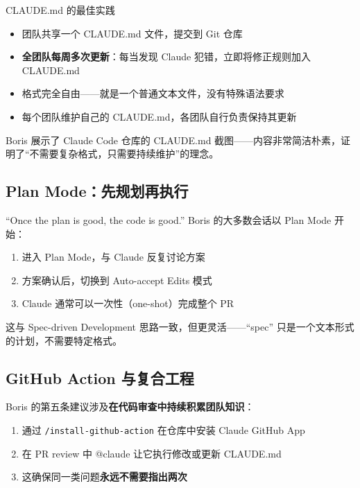 \begin{importantbox}{CLAUDE.md 的最佳实践}
\begin{itemize}
    \item 团队共享一个 CLAUDE.md 文件，提交到 Git 仓库
    \item \textbf{全团队每周多次更新}：每当发现 Claude 犯错，立即将修正规则加入 CLAUDE.md
    \item 格式完全自由——就是一个普通文本文件，没有特殊语法要求
    \item 每个团队维护自己的 CLAUDE.md，各团队自行负责保持其更新
\end{itemize}
\end{importantbox}

Boris 展示了 Claude Code 仓库的 CLAUDE.md 截图——内容非常简洁朴素，证明了``不需要复杂格式，只需要持续维护''的理念。

\subsection{Plan Mode：先规划再执行}

\begin{importantbox}{``Once the plan is good, the code is good.''}
Boris 的大多数会话以 Plan Mode 开始：
\begin{enumerate}
    \item 进入 Plan Mode，与 Claude 反复讨论方案
    \item 方案确认后，切换到 Auto-accept Edits 模式
    \item Claude 通常可以一次性（one-shot）完成整个 PR
\end{enumerate}
这与 Spec-driven Development 思路一致，但更灵活——``spec'' 只是一个文本形式的计划，不需要特定格式。
\end{importantbox}

\subsection{GitHub Action 与复合工程}

Boris 的第五条建议涉及\textbf{在代码审查中持续积累团队知识}：

\begin{enumerate}
    \item 通过 \texttt{/install-github-action} 在仓库中安装 Claude GitHub App
    \item 在 PR review 中 @claude 让它执行修改或更新 CLAUDE.md
    \item 这确保同一类问题\textbf{永远不需要指出两次}
\end{enumerate}

